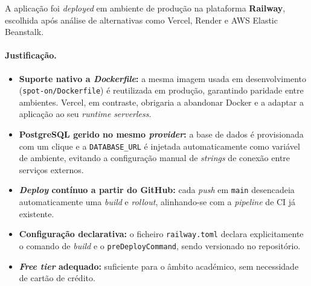 \documentclass[11pt,a4paper]{article}
\begin{document}
A aplicação foi \emph{deployed} em ambiente de produção na plataforma
\textbf{Railway}, escolhida após análise de alternativas como Vercel, Render e
AWS Elastic Beanstalk.

\paragraph{Justificação.}
\begin{itemize}[leftmargin=*]
    \item \textbf{Suporte nativo a \emph{Dockerfile}:} a mesma imagem usada em
          desenvolvimento (\texttt{spot-on/Dockerfile}) é reutilizada em
          produção, garantindo paridade entre ambientes. Vercel, em contraste,
          obrigaria a abandonar Docker e a adaptar a aplicação ao seu
          \emph{runtime} \emph{serverless}.
    \item \textbf{PostgreSQL gerido no mesmo \emph{provider}:} a base de dados
          é provisionada com um clique e a \texttt{DATABASE\_URL} é injetada
          automaticamente como variável de ambiente, evitando a configuração
          manual de \emph{strings} de conexão entre serviços externos.
    \item \textbf{\emph{Deploy} contínuo a partir do GitHub:} cada \emph{push}
          em \texttt{main} desencadeia automaticamente uma \emph{build} e
          \emph{rollout}, alinhando-se com a \emph{pipeline} de CI já existente.
    \item \textbf{Configuração declarativa:} o ficheiro \texttt{railway.toml}
          declara explicitamente o comando de \emph{build} e o
          \texttt{preDeployCommand}, sendo versionado no repositório.
    \item \textbf{\emph{Free tier} adequado:} suficiente para o âmbito
          académico, sem necessidade de cartão de crédito.
\end{itemize}
\end{document}
